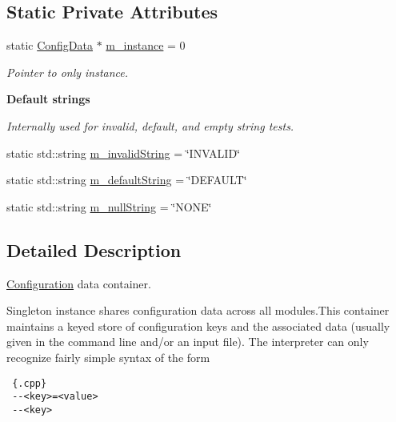 \subsection*{Static Private Attributes}
\begin{CompactItemize}
\item 
\hypertarget{classConfiguration_1_1ConfigData_0b8a04cd0b688e7498f15b6cfaed6427}{
static \hyperlink{classConfiguration_1_1ConfigData}{Config\-Data} $\ast$ \hyperlink{classConfiguration_1_1ConfigData_0b8a04cd0b688e7498f15b6cfaed6427}{m\_\-instance} = 0}
\label{classConfiguration_1_1ConfigData_0b8a04cd0b688e7498f15b6cfaed6427}

\begin{CompactList}\small\item\em Pointer to only instance. \item\end{CompactList}\end{CompactItemize}
\begin{Indent}{\bf Default strings}\par
{\em Internally used for invalid, default, and empty string tests. }\begin{CompactItemize}
\item 
static std::string \hyperlink{classConfiguration_1_1ConfigData_71636ef903c56dca29298a03a987978a}{m\_\-invalid\-String} = \char`\"{}INVALID\char`\"{}
\item 
static std::string \hyperlink{classConfiguration_1_1ConfigData_2444b2697d81af2d1120f04c34d77857}{m\_\-default\-String} = \char`\"{}DEFAULT\char`\"{}
\item 
static std::string \hyperlink{classConfiguration_1_1ConfigData_dd898944bb87347fd5ebf9697d42dc7a}{m\_\-null\-String} = \char`\"{}NONE\char`\"{}
\end{CompactItemize}
\end{Indent}


\subsection{Detailed Description}
\hyperlink{namespaceConfiguration}{Configuration} data container. 

Singleton instance shares configuration data across all modules.This container maintains a keyed store of configuration keys and the associated data (usually given in the command line and/or an input file). The interpreter can only recognize fairly simple syntax of the form 

\begin{Code}\begin{verbatim} {.cpp} 
 --<key>=<value>
 --<key>
\end{verbatim}\end{Code}




